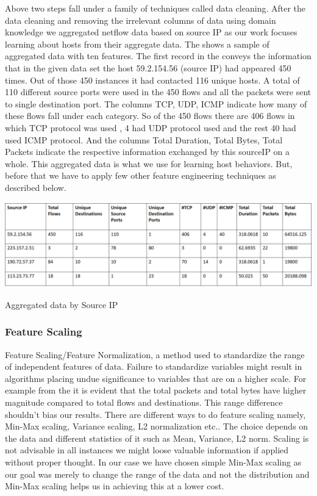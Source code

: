 Above two steps fall under a family of techniques called data cleaning. After the data cleaning and removing the irrelevant columns of data using domain knowledge we aggregated netflow data based on source IP as our work focuses learning about hosts from their aggregate data. The  shows a sample of aggregated data with ten features.
The first record in the  conveys the information that in the given data set the host 59.2.154.56 (source IP) had appeared 450 times. Out of those 450 instances it had contacted 116 unique hosts. A total of 110 different source ports were used in the 450 flows and all the packets were sent to single destination port. The columns TCP, UDP, ICMP indicate how many of these flows fall under each category. So of the 450 flows there are 406 flows in which TCP protocol was used , 4 had UDP protocol used and the rest 40 had used ICMP protocol. And the columns Total Duration, Total Bytes, Total Packets indicate the respective information exchanged by this sourceIP on a whole. This aggregated data is what we use for learning host behaviors. But, before that we have to apply few other feature engineering techniques as described below.

\begin{table}[ht]
	\centerline{\includegraphics[scale = 0.6]{aggregated.png}}
	\caption{Aggregated data by Source IP}%
\end{table}


\subsubsection{Feature Scaling} 
Feature Scaling/Feature Normalization, a method used to standardize the range of independent features of data. Failure to standardize variables might result in algorithms placing undue significance to variables that are on a higher scale. For example from the  it is evident that the total packets and total bytes have higher magnitude compared to total flows and destinations. This range difference shouldn't bias our results.
There are different ways to do feature scaling namely, Min-Max scaling, Variance scaling, L2 normalization etc.. The choice depends on the data and different statistics of it such as Mean, Variance, L2 norm. Scaling is not advisable in all instances we might	loose valuable information if applied without proper thought. In our case we have chosen simple Min-Max scaling as our goal was merely to change the range of the data and not the distribution and Min-Max scaling helps us in achieving this at a lower cost.



